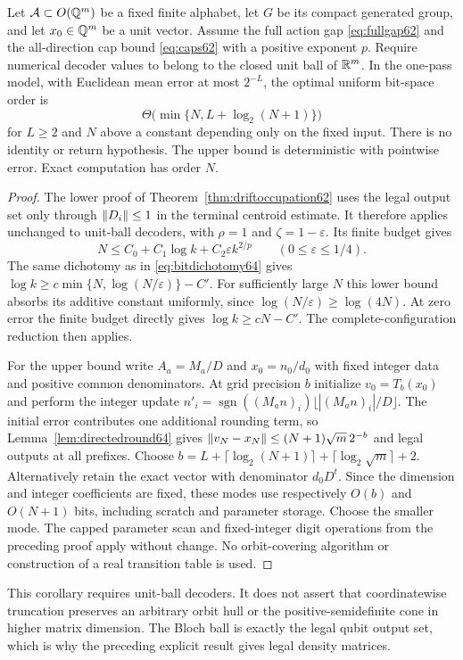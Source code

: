 \begin{corollary}\label{cor:rationalspace64}
Let $\mathcal A\subset O(\mathbb Q^m)$ be a fixed finite alphabet, let $G$
be its compact generated group, and let $x_0\in\mathbb Q^m$ be a unit vector.
Assume the full action gap \eqref{eq:fullgap62} and the all-direction
cap bound \eqref{eq:caps62} with a positive exponent $p$.
Require numerical decoder values to belong to the closed unit ball
of $\mathbb R^m$. In the one-pass model, with Euclidean mean error at most
$2^{-L}$, the optimal uniform bit-space order is
\[
             \Theta\bigl(\min\{N,L+\log_2(N+1)\}\bigr)
\]
for $L\ge2$ and $N$ above a constant depending only on the fixed
input. There is no identity or return hypothesis. The upper bound is
deterministic with pointwise error. Exact computation has order $N$.
\end{corollary}
\begin{proof}
The lower proof of Theorem~\ref{thm:driftoccupation62} uses the legal
output set only through $\lVert D_i\rVert\le1$ in the terminal centroid
estimate. It therefore applies unchanged to unit-ball decoders, with
$\rho=1$ and $\zeta=1-\varepsilon$. Its finite budget gives
\[
 N\le C_0+C_1\log k+C_2\varepsilon k^{2/p}
                   \qquad(0\le\varepsilon\le1/4).
\]
The same dichotomy as in \eqref{eq:bitdichotomy64} gives
$\log k\ge c\min\{N,\log(N/\varepsilon)\}-C'$.
For sufficiently large $N$ this lower bound absorbs its additive
constant uniformly, since $\log(N/\varepsilon)\ge\log(4N)$.
At zero error the finite budget directly gives $\log k\ge cN-C'$.
The complete-configuration reduction then applies.

For the upper bound write $A_a=M_a/D$ and $x_0=n_0/d_0$ with fixed
integer data and positive common denominators. At grid precision $b$
initialize $v_0=T_b(x_0)$ and perform the integer update
$n'_i=\operatorname{sgn}((M_an)_i)\lfloor |(M_an)_i|/D\rfloor$.
The initial error contributes one additional rounding term, so
Lemma~\ref{lem:directedround64} gives
$\lVert v_N-x_N\rVert\le(N+1)\sqrt m\,2^{-b}$ and legal outputs at
all prefixes. Choose
$b=L+\lceil\log_2(N+1)\rceil+\lceil\log_2\sqrt m\rceil+2$.
Alternatively retain the exact vector with denominator $d_0D^t$.
Since the dimension and integer coefficients are fixed, these modes
use respectively $O(b)$ and $O(N+1)$ bits, including scratch and
parameter storage. Choose the smaller mode. The capped parameter
scan and fixed-integer digit operations from the preceding proof
apply without change. No orbit-covering algorithm or construction of
a real transition table is used.
\end{proof}
This corollary requires unit-ball decoders. It does not assert that
coordinatewise truncation preserves an arbitrary orbit hull or the
positive-semidefinite cone in higher matrix dimension. The Bloch ball
is exactly the legal qubit output set, which is why the preceding
explicit result gives legal density matrices.

